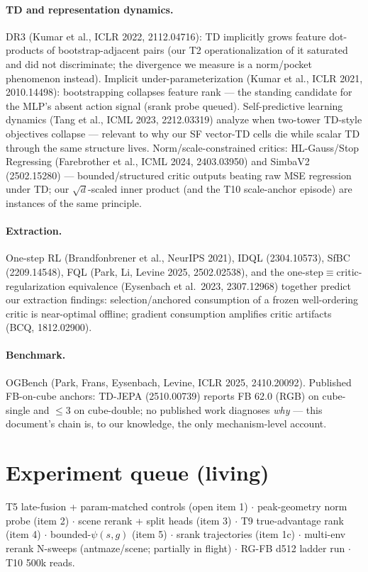 \documentclass[11pt]{article}
\begin{document}
\paragraph{TD and representation dynamics.} DR3 (Kumar et al., ICLR 2022, 2112.04716):
TD implicitly grows feature dot-products of bootstrap-adjacent pairs (our T2
operationalization of it saturated and did not discriminate; the divergence we measure is a
norm/pocket phenomenon instead). Implicit under-parameterization (Kumar et al., ICLR 2021,
2010.14498): bootstrapping collapses feature rank --- the standing candidate for the MLP's
absent action signal (srank probe queued). Self-predictive learning dynamics (Tang et al.,
ICML 2023, 2212.03319) analyze when two-tower TD-style objectives collapse --- relevant to
why our SF vector-TD cells die while scalar TD through the same structure lives.
Norm/scale-constrained critics: HL-Gauss/Stop Regressing (Farebrother et al., ICML 2024,
2403.03950) and SimbaV2 (2502.15280) --- bounded/structured critic outputs beating raw MSE
regression under TD; our $\sqrt d$-scaled inner product (and the T10 scale-anchor episode)
are instances of the same principle.

\paragraph{Extraction.} One-step RL (Brandfonbrener et al., NeurIPS 2021), IDQL
(2304.10573), SfBC (2209.14548), FQL (Park, Li, Levine 2025, 2502.02538), and the
one-step$\equiv$critic-regularization equivalence (Eysenbach et al.\ 2023, 2307.12968)
together predict our extraction findings: selection/anchored consumption of a frozen
well-ordering critic is near-optimal offline; gradient consumption amplifies critic
artifacts (BCQ, 1812.02900).

\paragraph{Benchmark.} OGBench (Park, Frans, Eysenbach, Levine, ICLR 2025, 2410.20092).
Published FB-on-cube anchors: TD-JEPA (2510.00739) reports FB 62.0 (RGB) on cube-single and
$\le$3 on cube-double; no published work diagnoses \emph{why} --- this document's chain is,
to our knowledge, the only mechanism-level account.

\section{Experiment queue (living)}\label{sec:queue}
T5 late-fusion + param-matched controls (open item 1) $\cdot$ peak-geometry norm probe
(item 2) $\cdot$ scene rerank + split heads (item 3) $\cdot$ T9 true-advantage rank
(item 4) $\cdot$ bounded-$\psi(s,g)$ (item 5) $\cdot$ srank trajectories (item 1c) $\cdot$
multi-env rerank N-sweeps (antmaze/scene; partially in flight) $\cdot$ RG-FB d512 ladder
run $\cdot$ T10 500k reads.
\end{document}

